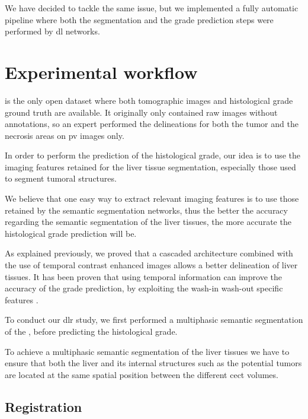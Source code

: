 We have decided to tackle the same issue, but we implemented a fully
automatic pipeline where both the segmentation and the grade prediction
steps were performed by \ac{dl} networks.

\section{Experimental workflow}\label{experimental-workflow}

 is the only open dataset where both tomographic images and
histological grade ground truth are available. It originally only
contained raw images without annotations, so an expert performed the
delineations for both the tumor and the necrosis areas on \ac{pv} images only.

In order to perform the prediction of the histological grade, our idea
is to use the imaging features retained for the liver tissue
segmentation, especially those used to segment tumoral structures.

We believe that one easy way to extract relevant imaging features is to
use those retained by the semantic segmentation networks, thus the
better the accuracy regarding the semantic segmentation of the liver
tissues, the more accurate the histological grade prediction will be.

As explained previously, we proved that a cascaded architecture combined
with the use of temporal contrast enhanced images allows a better
delineation of liver tissues. It has been proven that using temporal information can improve the accuracy of the grade prediction, by exploiting the wash-in
wash-out specific features \cite{Okamoto2012}.

To conduct our \ac{dlr} study, we first performed a multiphasic
semantic segmentation of the , before predicting the
histological grade.

To achieve a multiphasic semantic segmentation of the liver tissues we
have to ensure that both the liver and its internal structures such as
the potential tumors are located at the same spatial position between
the different \ac{cect} volumes.


\subsection{Registration}\label{registration}

